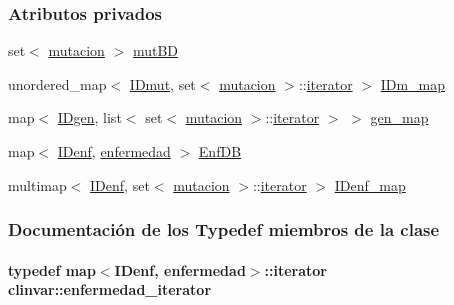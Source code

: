\subsubsection*{Atributos privados}
\begin{DoxyCompactItemize}
\item 
set$<$ \hyperlink{classmutacion}{mutacion} $>$ \hyperlink{classclinvar_a7e717fefc1fb718a4b801db416d7df09}{mut\+BD}
\item 
unordered\+\_\+map$<$ \hyperlink{classclinvar_a4ad33b1d063a729b56ea6ed9e4e2700d}{I\+Dmut}, set$<$ \hyperlink{classmutacion}{mutacion} $>$\+::\hyperlink{classclinvar_1_1iterator}{iterator} $>$ \hyperlink{classclinvar_ac978af60b36713988bf1d8f5f6cd0e15}{I\+Dm\+\_\+map}
\item 
map$<$ \hyperlink{classclinvar_aa6cdb39378649a250def3e20163d3113}{I\+Dgen}, list$<$ set$<$ \hyperlink{classmutacion}{mutacion} $>$\+::\hyperlink{classclinvar_1_1iterator}{iterator} $>$ $>$ \hyperlink{classclinvar_a2c9b3170058000631633b151a787265f}{gen\+\_\+map}
\item 
map$<$ \hyperlink{classclinvar_a2c121e1c9c137330a57590fe9f4e65ab}{I\+Denf}, \hyperlink{classenfermedad}{enfermedad} $>$ \hyperlink{classclinvar_aa2c6c2491a8f4b3c1617b001e1576368}{Enf\+DB}
\item 
multimap$<$ \hyperlink{classclinvar_a2c121e1c9c137330a57590fe9f4e65ab}{I\+Denf}, set$<$ \hyperlink{classmutacion}{mutacion} $>$\+::\hyperlink{classclinvar_1_1iterator}{iterator} $>$ \hyperlink{classclinvar_a6f17f858a717bc6c09bd1b5651c47d58}{I\+Denf\+\_\+map}
\end{DoxyCompactItemize}


\subsubsection{Documentación de los \textquotesingle{}Typedef\textquotesingle{} miembros de la clase}
\paragraph[{\texorpdfstring{enfermedad\+\_\+iterator}{enfermedad_iterator}}]{\setlength{\rightskip}{0pt plus 5cm}typedef map$<${\bf I\+Denf}, {\bf enfermedad}$>$\+::{\bf iterator} {\bf clinvar\+::enfermedad\+\_\+iterator}}\hypertarget{classclinvar_a4e04baa8b244566f2c25347c18f036b0}{}\label{classclinvar_a4e04baa8b244566f2c25347c18f036b0}
